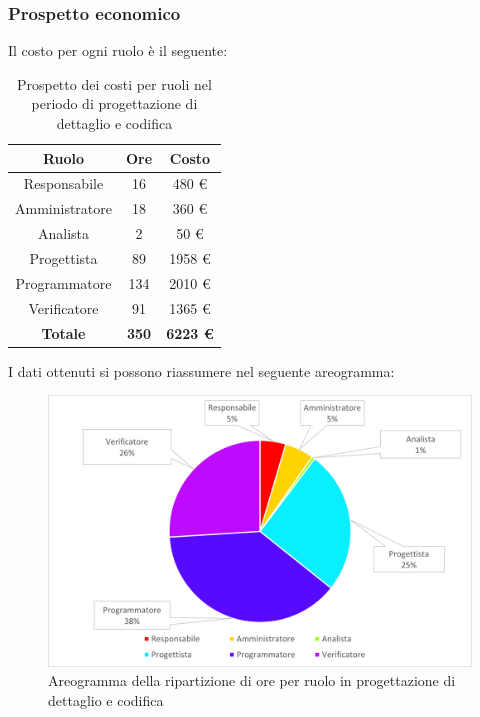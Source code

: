 \subsubsection{Prospetto economico}
Il costo per ogni ruolo è il seguente:
\begin{table}[H]
		\begin{center}
			\setlength{\aboverulesep}{0pt}
			\setlength{\belowrulesep}{0pt}
			\setlength{\extrarowheight}{.75ex}
			\begin{tabular}{ c c c }
				\rowcolor{AzzurroGruppo!30} 
				\textbf{Ruolo} & \textbf{Ore} & \textbf{Costo}  \\
				\toprule
				Responsabile   & 16 & 480 \euro \\
				Amministratore & 18 & 360 \euro \\
				Analista       & 2 & 50 \euro \\
				Progettista    & 89 & 1958 \euro \\
				Programmatore  & 134 & 2010 \euro \\
				Verificatore   & 91 & 1365 \euro \\
				\textbf{Totale} & \textbf{350} & \textbf{6223 \euro} \\
				\bottomrule
			\end{tabular}
			\caption{ Prospetto dei costi per ruoli nel periodo di progettazione di dettaglio e codifica}
		\end{center}
	\end{table}
I dati ottenuti si possono riassumere nel seguente areogramma:
\begin{figure}[H]
    \centering
    \includegraphics[scale = 0.5]{components/img/Sprint-8-9-torta.png}
    \caption{ Areogramma della ripartizione di ore per ruolo in progettazione di dettaglio e codifica}
    \label{fig:Areogramma ripartizione ore, fase di progettazione di dettaglio e codifica}
\end{figure}
